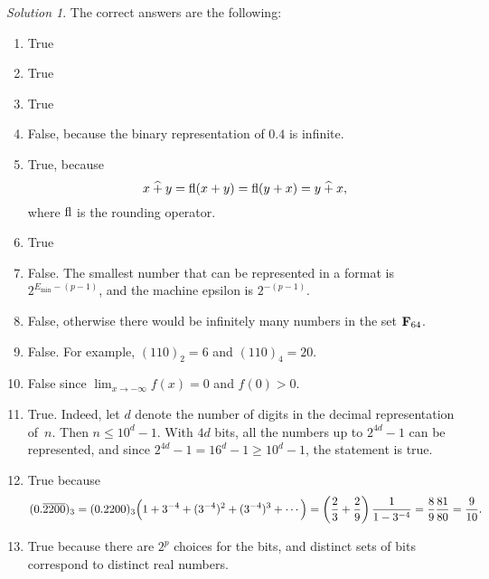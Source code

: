 \documentclass[11pt]{article}
\theoremstyle{definition}
\theoremstyle{remark}
\newtheorem*{protosolution}{Solution}
\newenvironment{solutionframe}
{%
    \begin{mdframed}[
        leftmargin=1cm,
        skipabove=.3cm,
        linecolor=blue,
        backgroundcolor=lightgreen,
        linewidth=0pt,
        innerleftmargin=.5em,
        innerrightmargin=.5em,
        innertopmargin=.3em,
        innerbottommargin=.6em,
    ]
}
{
    \end{mdframed}
}
\newenvironment{solution}
{\pushQED{\qed}\renewcommand{\qedsymbol}{$\triangle$}
\begin{solutionframe}\small \begin{protosolution}}
{\popQED\end{protosolution}\end{solutionframe}}
\begin{document}
\newpage
\begin{solution}
    The correct answers are the following:
    \begin{enumerate}
        \item True
        \item True
        \item True
        \item False, because the binary representation of $0.4$ is infinite.
        \item
            True, because
            \[
                x \mathbin{\widehat +} y = {\rm fl} (x + y) = {\rm fl} (y + x) = y \mathbin{\widehat +} x,
            \]
            where ${\rm fl}$ is the rounding operator.
        \item True
        \item
            False.
            The smallest number that can be represented in a format is $2^{E_{\min}-(p-1)}$,
            and the machine epsilon is $2^{-(p-1)}$.
        \item
            False, otherwise there would be infinitely many numbers in the set $\mathbf F_{64}$.

        \item
            False. For example, $(110)_2 = 6$ and $(110)_4 = 20$.

        \item
            False since $\lim_{x \to -\infty} f(x) = 0$ and $f(0) > 0$.

        \item
            True. Indeed, let $d$ denote the number of digits in the decimal representation of~$n$.
            Then $n \leq 10^d - 1$.
            With $4d$ bits, all the numbers up to $2^{4d}- 1$ can be represented,
            and since $2^{4d} - 1 = 16^d - 1 \geq 10^d - 1$,
            the statement is true.

        \item
            True because
            \[
                (0.\overline{2200})_3 = (0.2200)_3 \Bigl(1 + 3^{-4} + (3^{-4})^2 + (3^{-4})^3 + \dotsb\Bigr)
                = \left(\frac{2}{3} + \frac{2}{9}\right)  \frac{1}{1 - 3^{-4}} = \frac{8}{9} \frac{81}{80} = \frac{9}{10}.
            \]

        \item
            True because there are $2^p$ choices for the bits,
            and distinct sets of bits correspond to distinct real numbers.
    \end{enumerate}
\end{solution}
\end{document}

